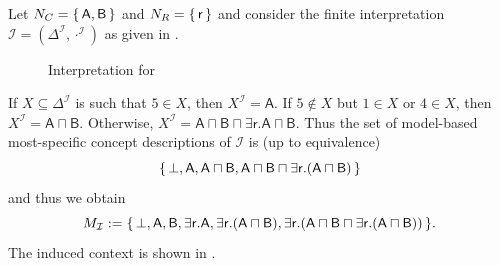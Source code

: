 \begin{Example}
  \label{expl:no-minimality}
  Let $N_C = {\{\, \mathsf{A}, \mathsf{B} \,\}}$ and $N_R = {\{\, \mathsf{r} \,\}}$ and consider
  the finite interpretation $\mathcal{I} = (\Delta^{\mathcal{I}}, \cdot^{\mathcal{I}})$ as
  given in .

  \begin{figure}[tp]
    \centering
    \caption{Interpretation for }
    \label{fig:no-minimality}
  \end{figure}

  If $X \subseteq \Delta^{\mathcal{I}}$ is such that $5 \in X$, then $X^{\mathcal{I}} =
  \mathsf{A}$.  If $5 \notin X$ but $1 \in X$ or $4 \in X$, then $X^{\mathcal{I}} =
  \mathsf{A} \sqcap \mathsf{B}$.  Otherwise, $X^{\mathcal{I}} = \mathsf{A \sqcap B \sqcap
    \exists r. A \sqcap B}$.  Thus the set of model-based most-specific concept
  descriptions of $\mathcal{I}$ is (up to equivalence)
  \begin{equation*}
    {\ensuremath{\{\, \bot, \mathsf{A}, \mathsf{A \sqcap B}, \mathsf{A \sqcap B \sqcap \exists
        r.(A \sqcap B)} \,\}}}
  \end{equation*}
  and thus we obtain
  \begin{equation*}
    M_{\mathcal{I}} := {\{\, \bot, \mathsf{A}, \mathsf{B}, \mathsf{\exists r. A},
      \mathsf{\exists r. (A \sqcap B)}, \mathsf{\exists r. (A \sqcap B \sqcap \exists
        r. (A \sqcap B))} \,\}}.
  \end{equation*}
  The induced context is shown in .


\end{Example}
